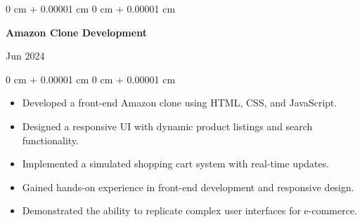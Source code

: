 \documentclass[10pt, letterpaper]{article}
\newenvironment{highlights}{
    \begin{itemize}[
        topsep=0.10 cm,
        parsep=0.10 cm,
        partopsep=0pt,
        itemsep=0pt,
        leftmargin=0 cm + 10pt
    ]
}{
    \end{itemize}
} %
\newenvironment{onecolentry}{
    \begin{adjustwidth}{
        0 cm + 0.00001 cm
    }{
        0 cm + 0.00001 cm
    }
}{
    \end{adjustwidth}
} %
\newenvironment{twocolentry}[2][]{
    \onecolentry
    \def\secondColumn{#2}
    \setcolumnwidth{\fill, 4.5 cm}
    \begin{paracol}{2}
}{
    \switchcolumn \raggedleft \secondColumn
    \end{paracol}
    \endonecolentry
} %
\begin{document}
\vspace{0.10 cm}
\begin{twocolentry}{Jun 2024}
    \textbf{Amazon Clone Development}
\end{twocolentry}


\vspace{0.10 cm}
\begin{onecolentry}
\begin{highlights}
\item Developed a front-end Amazon clone using HTML, CSS, and JavaScript.
\item Designed a responsive UI with dynamic product listings and search functionality.
\item Implemented a simulated shopping cart system with real-time updates.
\item Gained hands-on experience in front-end development and responsive design.
\item Demonstrated the ability to replicate complex user interfaces for e-commerce.
\end{highlights}
\end{onecolentry}













      

\end{document}
